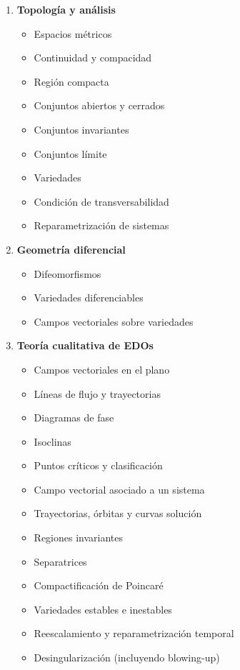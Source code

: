 \begin{enumerate}
    	\item \textbf{Topología y análisis}
    	\begin{itemize}
    		\item Espacios métricos
    		\item Continuidad y compacidad
    		\item Región compacta
    		\item Conjuntos abiertos y cerrados
    		\item Conjuntos invariantes
    		\item Conjuntos límite
    		\item Variedades
    		\item Condición de transversabilidad
    		\item Reparametrización de sistemas
    	\end{itemize}
    	
    	\item \textbf{Geometría diferencial}
    	\begin{itemize}
    		\item Difeomorfismos
    		\item Variedades diferenciables
    		\item Campos vectoriales sobre variedades
    	\end{itemize}
    	
    	\item \textbf{Teoría cualitativa de EDOs}
    	\begin{itemize}
    		\item Campos vectoriales en el plano
    		\item Líneas de flujo y trayectorias
    		\item Diagramas de fase
    		\item Isoclinas
    		\item Puntos críticos y clasificación
    		\item Campo vectorial asociado a un sistema
    		\item Trayectorias, órbitas y curvas solución
    		\item Regiones invariantes
    		\item Separatrices
    		\item Compactificación de Poincaré
    		\item Variedades estables e inestables
    		\item Reescalamiento y reparametrización temporal
    		\item Desingularización (incluyendo blowing-up)
    	\end{itemize}
    	

\end{enumerate}
